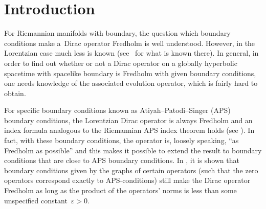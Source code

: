 \documentclass[pdftex]{sigma}
\numberwithin{equation}{section}
\begin{document}
\allowdisplaybreaks

\newcommand{\arXivNumber}{2408.16696}

\renewcommand{\PaperNumber}{088}

\FirstPageHeading










	\section{Introduction}
For Riemannian manifolds with boundary, the question which boundary conditions make a~Dirac operator Fredholm is well understood. However, in the Lorentzian case much less is known (see~\cite{BH} for what is known there). In general,  in order to find out whether or not a Dirac operator on a globally hyperbolic spacetime with spacelike boundary is Fredholm with given boundary conditions, one needs knowledge of the associated evolution operator, which is fairly hard to obtain.
	
For specific boundary conditions known as Atiyah--Patodi--Singer (APS) boundary conditions, the Lorentzian Dirac operator is always Fredholm and an index formula analogous to the Riemannian APS index theorem holds (see \cite{BSglobal,BSlocal}). In fact, with these boundary conditions, the operator is, loosely speaking, ``as Fredholm as possible'' and this makes it possible to extend the result to boundary conditions that are close to APS boundary conditions. In \cite[Proposition~4.5]{BH}, it is shown that boundary conditions given by the graphs of certain operators (such that the zero operators correspond exactly to APS-conditions) still make the Dirac operator Fredholm as long as the product of the operators' norms is less than some unspecified constant~${\varepsilon>0}$.
	
\end{document}

